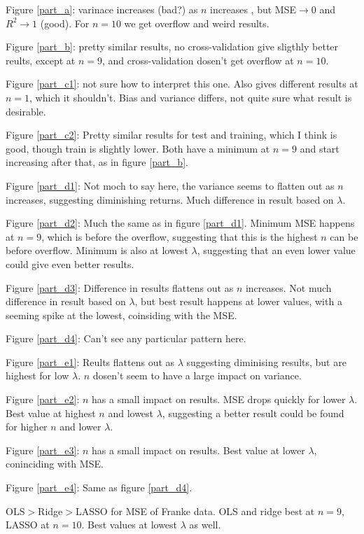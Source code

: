\documentclass[a4paper,10pt,english]{article}
\begin{document}
Figure \ref{part_a}: varinace increases (bad?) as $n$ increases , but MSE$\rightarrow 0$ and $R^2\rightarrow 1$ (good). For $n=10$ we get overflow and weird results.

Figure \ref{part_b}: pretty similar results, no cross-validation give sligthly better reults, except at $n=9$, and cross-validation dosen't get overflow at $n=10$.

Figure \ref{part_c1}: not sure how to interpret this one. Also gives different results at $n=1$, which it shouldn't. Bias and variance differs, not quite sure what result is desirable.

Figure \ref{part_c2}: Pretty similar results for test and training, which I think is good, though train is slightly lower. Both have a minimum at $n=9$ and start increasing after that, as in figure \ref{part_b}. 

Figure \ref{part_d1}: Not moch to say here, the variance seems to flatten out as $n$ increases, suggesting diminishing returns. Much difference in result based on $\lambda$.

Figure \ref{part_d2}: Much the same as in figure \ref{part_d1}. Minimum MSE happens at $n=9$, which is before the overflow, suggesting that this is the highest $n$ can be before overflow. Minimum is also at lowest $\lambda$, suggesting that an even lower value could give even better results.

Figure \ref{part_d3}: Difference in results flattens out as $n$ increases. Not much difference in result based on $\lambda$, but best result happens at lower values, with a seeming spike at the lowest, coinsiding with the MSE. 

Figure \ref{part_d4}: Can't see any particular pattern here.

Figure \ref{part_e1}: Reults flattens out as $\lambda$ suggesting diminising results, but are highest for low $\lambda$. $n$ dosen't seem to have a large impact on variance.

Figure \ref{part_e2}: $n$ has a small impact on results. MSE drops quickly for lower $\lambda$. Best value at highest $n$ and lowest $\lambda$, suggesting a better result could be found for higher $n$ and lower $\lambda$.

Figure \ref{part_e3}: $n$ has a small impact on results. Best value at lower $\lambda$, coninciding with MSE. 

Figure \ref{part_e4}: Same as figure \ref{part_d4}.

OLS$>$Ridge$>$LASSO for MSE of Franke data. OLS and ridge best at $n=9$, LASSO at $n=10$. Best values at lowest $\lambda$ as well.
\end{document}
